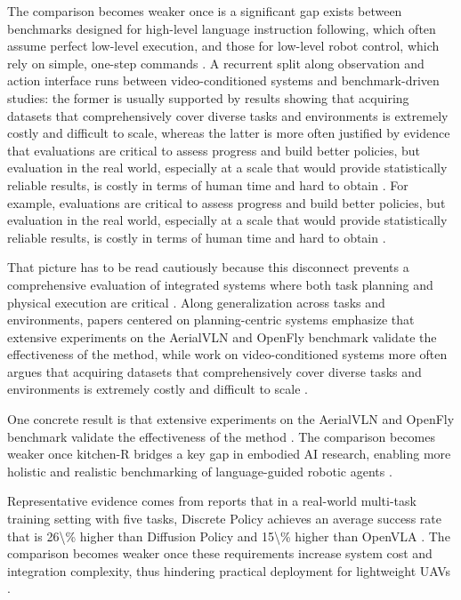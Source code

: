 \documentclass[a4paper,11pt]{article}
\begin{document}
The comparison becomes weaker once is a significant gap exists between benchmarks designed for high-level language instruction following, which often assume perfect low-level execution, and those for low-level robot control, which rely on simple, one-step commands \citep{Kachaev2025Mind}. A recurrent split along observation and action interface runs between video-conditioned systems and benchmark-driven studies: the former is usually supported by results showing that acquiring datasets that comprehensively cover diverse tasks and environments is extremely costly and difficult to scale, whereas the latter is more often justified by evidence that evaluations are critical to assess progress and build better policies, but evaluation in the real world, especially at a scale that would provide statistically reliable results, is costly in terms of human time and hard to obtain \citep{Dai2026Conla,Xu2025Aerial,Zhou2025Autoeval,Kachaev2025Mind}. For example, evaluations are critical to assess progress and build better policies, but evaluation in the real world, especially at a scale that would provide statistically reliable results, is costly in terms of human time and hard to obtain \citep{Zhou2025Autoeval}.

That picture has to be read cautiously because this disconnect prevents a comprehensive evaluation of integrated systems where both task planning and physical execution are critical \citep{Kachaev2025Mind}. Along generalization across tasks and environments, papers centered on planning-centric systems emphasize that extensive experiments on the AerialVLN and OpenFly benchmark validate the effectiveness of the method, while work on video-conditioned systems more often argues that acquiring datasets that comprehensively cover diverse tasks and environments is extremely costly and difficult to scale \citep{Xu2025Aerial,Kachaev2025Mind,Dai2026Conla}.

One concrete result is that extensive experiments on the AerialVLN and OpenFly benchmark validate the effectiveness of the method \citep{Xu2025Aerial}. The comparison becomes weaker once kitchen-R bridges a key gap in embodied AI research, enabling more holistic and realistic benchmarking of language-guided robotic agents \citep{Kachaev2025Mind}.

Representative evidence comes from reports that in a real-world multi-task training setting with five tasks, Discrete Policy achieves an average success rate that is 26\textbackslash{}\% higher than Diffusion Policy and 15\textbackslash{}\% higher than OpenVLA \citep{Wu2024Discrete}. The comparison becomes weaker once these requirements increase system cost and integration complexity, thus hindering practical deployment for lightweight UAVs \citep{Xu2025Aerial}.
\end{document}
